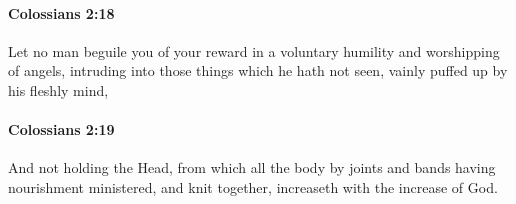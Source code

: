 		\paragraph{Colossians 2:18} %
			\label{COLOSSIANS-2-18}

			Let no man beguile you of your reward in a voluntary humility and worshipping of angels, intruding into those things which he hath not seen, vainly puffed up by his fleshly mind,

			\begin{framed}
		\scriptsize
				\begin{compactdesc}
					\item[SBLG] 
				\end{compactdesc}
			\end{framed}

		\paragraph{Colossians 2:19} %
			\label{COLOSSIANS-2-19}

			And not holding the Head, from which all the body by joints and bands having nourishment ministered, and knit together, increaseth with the increase of God.

